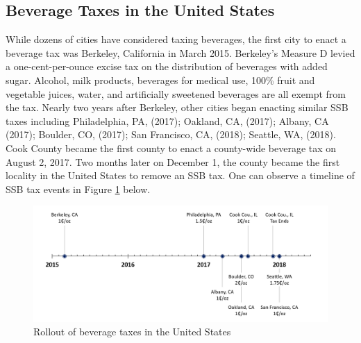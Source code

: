 \documentclass[12pt]{article}
\begin{document}
\subsection{Beverage Taxes in the United States}

While dozens of cities have considered taxing beverages, the first city to enact a beverage tax was Berkeley, California in March 2015. Berkeley's Measure D levied a one-cent-per-ounce excise tax on the distribution of beverages with added sugar. Alcohol, milk products, beverages for medical use, 100\% fruit and vegetable juices, water, and artificially sweetened beverages are all exempt from the tax. Nearly two years after Berkeley, other cities began enacting similar SSB taxes including Philadelphia, PA, (2017); Oakland, CA, (2017); Albany, CA (2017); Boulder, CO, (2017); San Francisco, CA, (2018); Seattle, WA, (2018). Cook County became the first county to enact a county-wide beverage tax on August 2, 2017. Two months later on December 1, the county became the first locality in the United States to remove an SSB tax. One can observe a timeline of SSB tax events in Figure \ref{taxtimeline} below.

\begin{figure}[t]\centering
\includegraphics[width = \textwidth]{../figures/taxtimeline.png}
\caption{Rollout of beverage taxes in the United States \label{taxtimeline}}
\end{figure}
\end{document}
